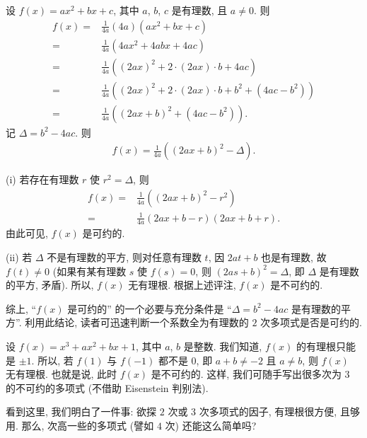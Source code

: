 \begin{example}
    设 $f(x) = ax^2 + bx + c$, 其中 $a$, $b$, $c$ 是有理数, 且 $a \neq 0$. 则
    \begin{align*}
        f(x)
        = {} & \frac{1}{4a} (4a) (ax^2 + bx + c)                                  \\
        = {} & \frac{1}{4a} (4ax^2 + 4abx + 4ac)                                  \\
        = {} & \frac{1}{4a} ((2ax)^2 + 2 \cdot (2ax) \cdot b + 4ac)               \\
        = {} & \frac{1}{4a} ((2ax)^2 + 2 \cdot (2ax) \cdot b + b^2 + (4ac - b^2)) \\
        = {} & \frac{1}{4a} ((2ax + b)^2 + (4ac - b^2)).
    \end{align*}
    记 $\Delta = b^2 - 4ac$. 则
    \begin{align*}
        f(x) = \frac{1}{4a} ((2ax + b)^2 - \Delta).
    \end{align*}

    (i) 若存在有理数 $r$ 使 $r^2 = \Delta$, 则
    \begin{align*}
        f(x)
        = {} & \frac{1}{4a} ((2ax + b)^2 - r^2)          \\
        = {} & \frac{1}{4a} (2ax + b - r) (2ax + b + r).
    \end{align*}
    由此可见, $f(x)$ 是可约的.

    (ii) 若 $\Delta$ 不是有理数的平方, 则对任意有理数 $t$, 因 $2at + b$ 也是有理数, 故 $f(t) \neq 0$ (如果有某有理数 $s$ 使 $f(s) = 0$, 则 $(2as + b)^2 = \Delta$, 即 $\Delta$ 是有理数的平方, 矛盾). 所以, $f(x)$ 无有理根. 根据上述评注, $f(x)$ 是不可约的.

    综上, ``$f(x)$ 是可约的'' 的一个必要与充分条件是 ``$\Delta = b^2 - 4ac$ 是有理数的平方''. 利用此结论, 读者可迅速判断一个系数全为有理数的 $2$ 次多项式是否是可约的.
\end{example}

\begin{example}
    设 $f(x) = x^3 + ax^2 + bx + 1$, 其中 $a$, $b$ 是整数. 我们知道, $f(x)$ 的有理根只能是 $\pm 1$. 所以, 若 $f(1)$ 与 $f(-1)$ 都不是 $0$, 即 $a + b \neq -2$ 且 $a \neq b$, 则 $f(x)$ 无有理根. 也就是说, 此时 $f(x)$ 是不可约的. 这样, 我们可随手写出很多次为 $3$ 的不可约的多项式 (不借助 Eisenstein 判别法).
\end{example}

看到这里, 我们明白了一件事: 欲探 $2$ 次或 $3$ 次多项式的因子, 有理根很方便, 且够用. 那么, 次高一些的多项式 (譬如 $4$ 次) 还能这么简单吗?

